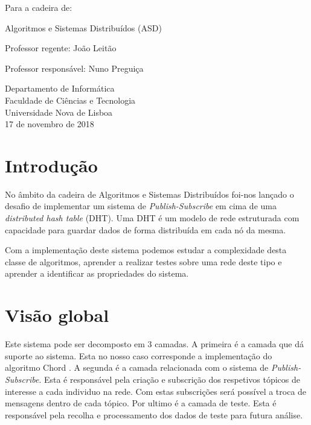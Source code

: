 \documentclass[12pt]{article}
\begin{document}
\begin{titlepage}
\begin{center}
        \vspace{0.5cm}
        
        Para a cadeira de:
        
        Algoritmos e Sistemas Distribuídos (ASD)
        
        \vspace{0.5cm}

		Professor regente: 
		João Leitão
		
		Professor responsável:
		Nuno Preguiça
		
        \vspace{0.5cm}
                
        Departamento de Informática\\
        Faculdade de Ciências e Tecnologia\\
        Universidade Nova de Lisboa\\
        17 de novembro de 2018
    \end{center}
\end{titlepage}

\newpage
\tableofcontents

\newpage
\listoffigures

\newpage
\listoftables

\newpage
\section{Introdução}

No âmbito da cadeira de Algoritmos e Sistemas Distribuídos foi-nos lançado o desafio de implementar um sistema de \emph{Publish-Subscribe} em cima de uma \emph{distributed hash table} (DHT). Uma DHT é um modelo de rede estruturada com capacidade para guardar dados de forma distribuída em cada nó da mesma.

Com a implementação deste sistema podemos estudar a complexidade desta classe de algoritmos, aprender a realizar testes sobre uma rede deste tipo e aprender a identificar as propriedades do sistema.

\newpage
\section{Visão global}

Este sistema pode ser decomposto em 3 camadas. A primeira é a camada que dá suporte ao sistema. Esta no nosso caso corresponde a implementação do algoritmo Chord \cite{b2}. A segunda é a camada relacionada com o sistema de \emph{Publish-Subscribe}. Esta é responsável pela criação e subscrição dos respetivos tópicos de interesse a cada individuo na rede. Com estas subscrições será possível a troca de mensagens dentro de cada tópico. Por ultimo é a camada de teste. Esta é responsável pela recolha e processamento dos dados de teste para futura análise. 
\end{document}
